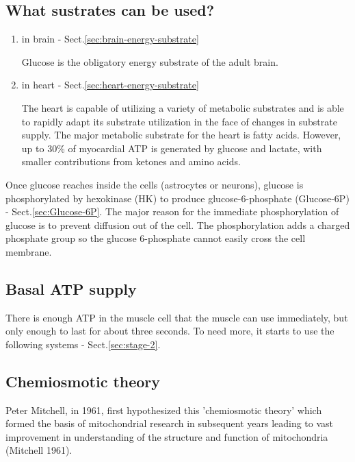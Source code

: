 \subsection{What sustrates can be used?}

\begin{enumerate}
  \item in brain - Sect.\ref{sec:brain-energy-substrate}

Glucose is the obligatory energy substrate of the adult brain.


   \item in heart - Sect.\ref{sec:heart-energy-substrate}

The heart is capable of utilizing a variety of metabolic substrates and is able
to rapidly adapt its substrate utilization in the face of changes in substrate supply.
The major metabolic substrate for the heart is fatty acids.
However, up to 30\% of myocardial ATP is generated by glucose and lactate, with
smaller contributions from ketones and amino acids.

\end{enumerate}

Once glucose reaches inside the cells (astrocytes or neurons), glucose is
phosphorylated by hexokinase (HK) to produce glucose-6-phosphate (Glucose-6P) -
Sect.\ref{sec:Glucose-6P}. The major reason for the immediate phosphorylation of
glucose is to prevent diffusion out of the cell. The phosphorylation adds a
charged phosphate group so the glucose 6-phosphate cannot easily cross the cell membrane.


\subsection{Basal ATP supply}

There is enough ATP in the muscle cell that the muscle can use immediately, but
only enough to last for about three seconds. To need more, it starts to use the
following systems - Sect.\ref{sec:stage-2}.


\subsection{Chemiosmotic theory}

Peter Mitchell, in 1961, first hypothesized this 'chemiosmotic theory' which
formed the basis of mitochondrial research in subsequent years leading to vast
improvement in understanding of the structure and function of mitochondria
(Mitchell 1961).

